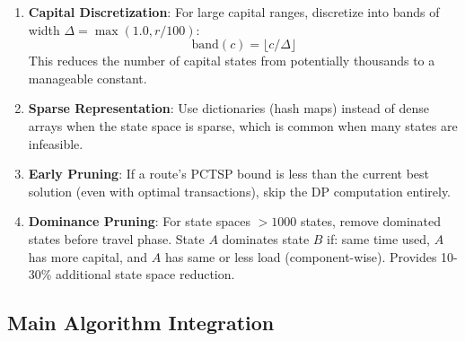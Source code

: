 \documentclass[12pt]{article}
\begin{document}
\begin{enumerate}
    \item \textbf{Capital Discretization}: For large capital ranges, discretize into bands of width $\Delta = \max(1.0, r / 100)$:
    $$\text{band}(c) = \lfloor c / \Delta \rfloor$$
    This reduces the number of capital states from potentially thousands to a manageable constant.
    
    \item \textbf{Sparse Representation}: Use dictionaries (hash maps) instead of dense arrays when the state space is sparse, which is common when many states are infeasible.
    
    \item \textbf{Early Pruning}: If a route's PCTSP bound is less than the current best solution (even with optimal transactions), skip the DP computation entirely.
    
    \item \textbf{Dominance Pruning}: For state spaces $> 1000$ states, remove dominated states before travel phase. State $A$ dominates state $B$ if: same time used, $A$ has more capital, and $A$ has same or less load (component-wise). Provides 10-30\% additional state space reduction.
\end{enumerate}

\subsection{Main Algorithm Integration}
\end{document}
